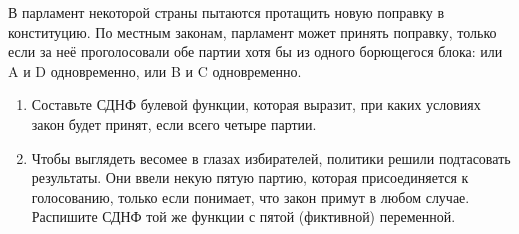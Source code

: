 \question
В парламент некоторой страны пытаются протащить новую поправку в конституцию. По местным законам, парламент может принять поправку, только если за неё проголосовали обе партии хотя бы из одного борющегося блока: или A и D одновременно, или B и C одновременно.

\begin{enumerate}
    \item Составьте СДНФ булевой функции, которая выразит, при каких условиях закон будет принят, если всего четыре партии.
    \item Чтобы выглядеть весомее в глазах избирателей, политики решили подтасовать результаты.  Они ввели некую пятую партию, которая присоединяется к голосованию, только если понимает, что закон примут в любом случае. Распишите СДНФ той же функции с пятой (фиктивной) переменной.
\end{enumerate}